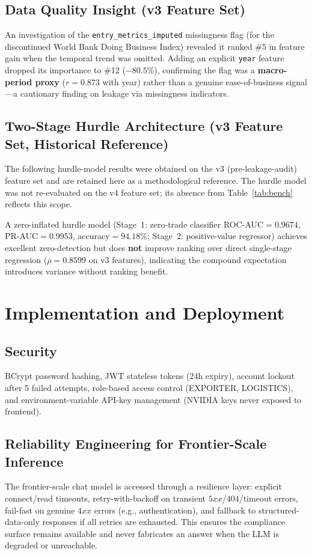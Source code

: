 \documentclass[conference]{IEEEtran}
\begin{document}
\subsection{Data Quality Insight (v3 Feature Set)}
An investigation of the \texttt{entry\_metrics\_imputed} missingness flag
(for the discontinued World Bank Doing Business Index) revealed it ranked
\#5 in feature gain when the temporal trend was omitted. Adding an
explicit \texttt{year} feature dropped its importance to \#12
($-80.5\%$), confirming the flag was a \textbf{macro-period proxy}
($r=0.873$ with year) rather than a genuine ease-of-business
signal---a cautionary finding on leakage via missingness indicators.

\subsection{Two-Stage Hurdle Architecture (v3 Feature Set, Historical Reference)}
\label{sub:hurdle}
The following hurdle-model results were obtained on the v3 (pre-leakage-audit)
feature set and are retained here as a methodological reference. The hurdle
model was not re-evaluated on the v4 feature set; its absence from
Table~\ref{tab:bench} reflects this scope.

A zero-inflated hurdle model (Stage~1: zero-trade classifier
ROC-AUC$=0.9674$, PR-AUC$=0.9953$, accuracy$=94.18\%$; Stage~2:
positive-value regressor) achieves excellent zero-detection but does
\textbf{not} improve ranking over direct single-stage regression
($\rho=0.8599$ on v3 features), indicating the compound expectation
introduces variance without ranking benefit.

\section{Implementation and Deployment}

\subsection{Security}
BCrypt password hashing, JWT stateless tokens (24h expiry), account
lockout after 5 failed attempts, role-based access control (EXPORTER,
LOGISTICS), and environment-variable API-key management (NVIDIA keys never
exposed to frontend).

\subsection{Reliability Engineering for Frontier-Scale Inference}
The frontier-scale chat model is accessed through a resilience layer:
explicit connect/read timeouts, retry-with-backoff on transient
$5xx$/$404$/timeout errors, fail-fast on genuine $4xx$ errors (e.g.,
authentication), and fallback to structured-data-only responses if all
retries are exhausted. This ensures the compliance surface remains
available and never fabricates an answer when the LLM is degraded or
unreachable.
\end{document}
